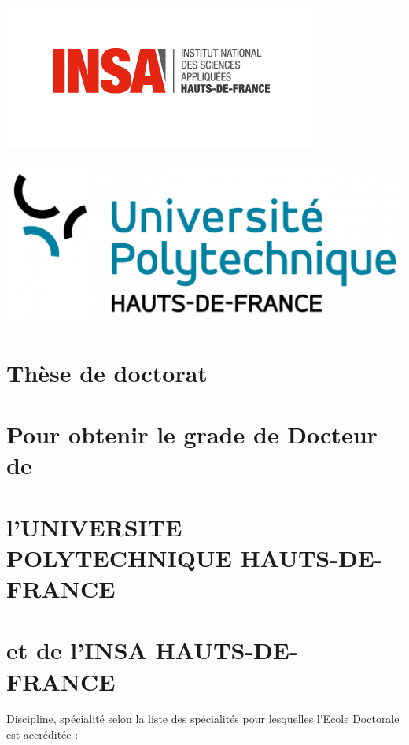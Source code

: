 \documentclass[a4paper,12pt]{article}
\author{PA156562}
\date{\today}
\title{}
\begin{document}
\begin{titlepage}

\begin{minipage}[t]{7cm}
\includegraphics[scale=1]{./logo/Logo_INSA_HDF-01-2.png}
\end{minipage}
\hfill
\begin{minipage}[t]{5.5cm}
\includegraphics[scale=0.12]{./logo/Logo_UPHF.png}
\end{minipage}

\begin{center}
\section*{Thèse de doctorat}
\label{sec:org2d82f11}
\vspace*{-6pt}
\section*{Pour obtenir le grade de Docteur de}
\label{sec:orgbc92321}
\vspace*{-6pt}
\section*{l'UNIVERSITE POLYTECHNIQUE HAUTS-DE-FRANCE}
\label{sec:orgce937df}
\vspace*{-6pt}
\section*{et de l'INSA HAUTS-DE-FRANCE}
\label{sec:orgce92926}
Discipline, spécialité selon la liste des spécialités pour lesquelles l'Ecole Doctorale est accréditée :
\vspace*{-12pt}

\end{center}
\end{titlepage}
\end{document}
